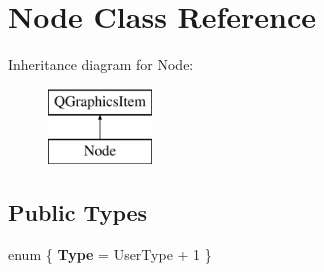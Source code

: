 \hypertarget{class_node}{}\section{Node Class Reference}
\label{class_node}
Inheritance diagram for Node\+:\begin{figure}[H]
\begin{center}
\leavevmode
\includegraphics[height=2.000000cm]{class_node}
\end{center}
\end{figure}
\subsection*{Public Types}
\begin{DoxyCompactItemize}
\item 
\mbox{\label{class_node_adf764cbdea00d65edcd07bb9953ad2b7}} 
enum \{ {\bfseries Type} = User\+Type + 1
 \}
\end{DoxyCompactItemize}
